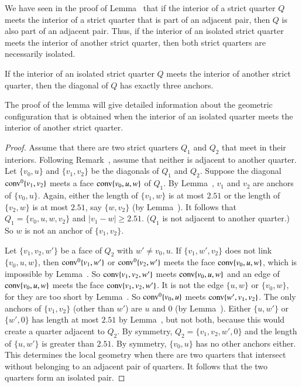 \begin{remark}
We have seen in the proof of Lemma~ that if
the interior of a strict quarter $Q$ meets the interior of a
strict quarter that is part of an adjacent pair, then $Q$ is also
part of an adjacent pair. Thus, if the interior of an isolated
strict quarter meets the interior of another strict quarter, then
both strict quarters are necessarily isolated.
\end{remark}

\begin{lemma}
If the interior of an isolated strict quarter $Q$ meets the
interior of another strict quarter, then the diagonal of $Q$ has
exactly three anchors.
\end{lemma}

The proof of the lemma will give detailed information about the
geometric configuration that is obtained when the interior of an
isolated quarter meets the interior of another strict quarter.

\begin{proof}  Assume that there are two strict quarters $Q_1$ and $Q_2$
that meet in their interiors.  Following Remark~,
assume that neither is adjacent to another quarter. Let $\{v_0,u\}$
and $\{v_1,v_2\}$ be the diagonals of $Q_1$ and $Q_2$. Suppose the
diagonal ${\operatorname{conv}}^0\{v_1,v_2\}$ meets a face ${\operatorname{conv}}\{v_0,u,w\}$ of $Q_1$.
By Lemma~, $v_1$ and $v_2$ are anchors of
$\{v_0,u\}$. Again, either the length of $\{v_1,w\}$ is at most
$2.51$ or the length of $\{v_2,w\}$ is at most $2.51$, say
$\{w,v_2\}$ (by Lemma~). It follows
that
    $Q_1=\{v_0,u,w,v_2\}$ and $|v_1-w|\ge2.51$.
($Q_1$ is not adjacent to another quarter.)  So $w$ is not an
anchor of $\{v_1,v_2\}$.

Let $\{v_1,v_2,w'\}$ be a face of $Q_2$ with $w'\ne v_0,u$. If
$\{v_1,w',v_2\}$ does not link $\{v_0,u,w\}$, then ${\operatorname{conv}}^0\{v_1,w'\}$ or
${\operatorname{conv}}^0\{v_2,w'\}$ meets the face ${\operatorname{conv}}\{v_0,u,w\}$, which is
impossible by Lemma~. So
${\operatorname{conv}}\{v_1,v_2,w'\}$  meets ${\operatorname{conv}}\{v_0,u,w\}$
and an edge of ${\operatorname{conv}}\{v_0,u,w\}$
meets the face ${\operatorname{conv}}\{v_1,v_2,w'\}$. It is not the edge
$\{u,w\}$ or $\{v_0,w\}$, for they are too short by
Lemma~.  So ${\operatorname{conv}}^0\{v_0,u\}$ meets 
${\operatorname{conv}}\{w',v_1,v_2\}$. The only anchors of $\{v_1,v_2\}$ (other
than $w'$) are $u$ and $0$ (by Lemma~).
Either $\{u,w'\}$ or $\{w',0\}$ has length at most $2.51$ by
Lemma~, but not both, because this
would create a quarter adjacent to $Q_2$. By symmetry,
$Q_2=\{v_1,v_2,w',0\}$ and the length of $\{u,w'\}$ is greater
than $2.51$. By symmetry, $\{v_0,u\}$ has no other anchors either.
This determines the local geometry when there are two quarters
that intersect without belonging to an adjacent pair of quarters.
It follows that the two quarters form an isolated pair.
\end{proof}

